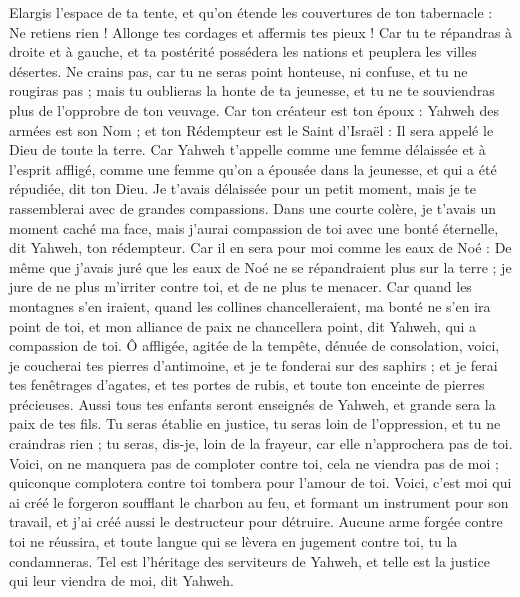 \begin{multicols}{2}
Elargis l'espace de ta tente, et qu'on étende les couvertures de ton tabernacle : Ne retiens rien ! Allonge tes cordages et affermis tes pieux !
Car tu te répandras à droite et à gauche, et ta postérité possédera les nations et peuplera les villes désertes.
Ne crains pas, car tu ne seras point honteuse, ni confuse, et tu ne rougiras pas ; mais tu oublieras la honte de ta jeunesse, et tu ne te souviendras plus de l'opprobre de ton veuvage.
Car ton créateur est ton époux : Yahweh des armées est son Nom ; et ton Rédempteur est le Saint d'Israël : Il sera appelé le Dieu de toute la terre.
Car Yahweh t'appelle comme une femme délaissée et à l'esprit affligé, comme une femme qu'on a épousée dans la jeunesse, et qui a été répudiée, dit ton Dieu.
Je t'avais délaissée pour un petit moment, mais je te rassemblerai avec de grandes compassions.
Dans une courte colère, je t'avais un moment caché ma face, mais j'aurai compassion de toi avec une bonté éternelle, dit Yahweh, ton rédempteur.
Car il en sera pour moi comme les eaux de Noé : De même que j'avais juré que les eaux de Noé ne se répandraient plus sur la terre ; je jure de ne plus m'irriter contre toi, et de ne plus te menacer.
Car quand les montagnes s'en iraient, quand les collines chancelleraient, ma bonté ne s'en ira point de toi, et mon alliance de paix ne chancellera point, dit Yahweh, qui a compassion de toi.
Ô affligée, agitée de la tempête, dénuée de consolation, voici, je coucherai tes pierres d'antimoine, et je te fonderai sur des saphirs ;
et je ferai tes fenêtrages d'agates, et tes portes de rubis, et toute ton enceinte de pierres précieuses.
Aussi tous tes enfants seront enseignés de Yahweh, et grande sera la paix de tes fils.
Tu seras établie en justice, tu seras loin de l'oppression, et tu ne craindras rien ; tu seras, dis-je, loin de la frayeur, car elle n'approchera pas de toi.
Voici, on ne manquera pas de comploter contre toi, cela ne viendra pas de moi ; quiconque complotera contre toi tombera pour l'amour de toi.
Voici, c'est moi qui ai créé le forgeron soufflant le charbon au feu, et formant un instrument pour son travail, et j'ai créé aussi le destructeur pour détruire.
Aucune arme forgée contre toi ne réussira, et toute langue qui se lèvera en jugement contre toi, tu la condamneras. Tel est l'héritage des serviteurs de Yahweh, et telle est la justice qui leur viendra de moi, dit Yahweh.

\end{multicols}
